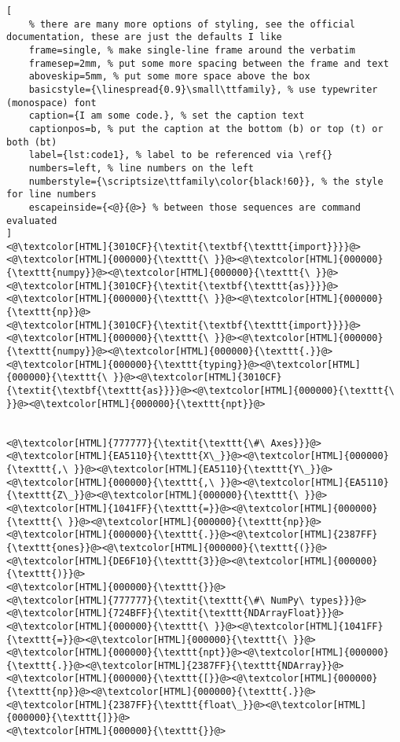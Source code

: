 \begin{lstlisting}[
	% there are many more options of styling, see the official documentation, these are just the defaults I like
	frame=single, % make single-line frame around the verbatim
	framesep=2mm, % put some more spacing between the frame and text
	aboveskip=5mm, % put some more space above the box
	basicstyle={\linespread{0.9}\small\ttfamily}, % use typewriter (monospace) font
	caption={I am some code.}, % set the caption text
	captionpos=b, % put the caption at the bottom (b) or top (t) or both (bt)
	label={lst:code1}, % label to be referenced via \ref{}
	numbers=left, % line numbers on the left
	numberstyle={\scriptsize\ttfamily\color{black!60}}, % the style for line numbers
	escapeinside={<@}{@>} % between those sequences are command evaluated
]
<@\textcolor[HTML]{3010CF}{\textit{\textbf{\texttt{import}}}}@><@\textcolor[HTML]{000000}{\texttt{\ }}@><@\textcolor[HTML]{000000}{\texttt{numpy}}@><@\textcolor[HTML]{000000}{\texttt{\ }}@><@\textcolor[HTML]{3010CF}{\textit{\textbf{\texttt{as}}}}@><@\textcolor[HTML]{000000}{\texttt{\ }}@><@\textcolor[HTML]{000000}{\texttt{np}}@>
<@\textcolor[HTML]{3010CF}{\textit{\textbf{\texttt{import}}}}@><@\textcolor[HTML]{000000}{\texttt{\ }}@><@\textcolor[HTML]{000000}{\texttt{numpy}}@><@\textcolor[HTML]{000000}{\texttt{.}}@><@\textcolor[HTML]{000000}{\texttt{typing}}@><@\textcolor[HTML]{000000}{\texttt{\ }}@><@\textcolor[HTML]{3010CF}{\textit{\textbf{\texttt{as}}}}@><@\textcolor[HTML]{000000}{\texttt{\ }}@><@\textcolor[HTML]{000000}{\texttt{npt}}@>


<@\textcolor[HTML]{777777}{\textit{\texttt{\#\ Axes}}}@>
<@\textcolor[HTML]{EA5110}{\texttt{X\_}}@><@\textcolor[HTML]{000000}{\texttt{,\ }}@><@\textcolor[HTML]{EA5110}{\texttt{Y\_}}@><@\textcolor[HTML]{000000}{\texttt{,\ }}@><@\textcolor[HTML]{EA5110}{\texttt{Z\_}}@><@\textcolor[HTML]{000000}{\texttt{\ }}@><@\textcolor[HTML]{1041FF}{\texttt{=}}@><@\textcolor[HTML]{000000}{\texttt{\ }}@><@\textcolor[HTML]{000000}{\texttt{np}}@><@\textcolor[HTML]{000000}{\texttt{.}}@><@\textcolor[HTML]{2387FF}{\texttt{ones}}@><@\textcolor[HTML]{000000}{\texttt{(}}@><@\textcolor[HTML]{DE6F10}{\texttt{3}}@><@\textcolor[HTML]{000000}{\texttt{)}}@>
<@\textcolor[HTML]{000000}{\texttt{}}@>
<@\textcolor[HTML]{777777}{\textit{\texttt{\#\ NumPy\ types}}}@>
<@\textcolor[HTML]{724BFF}{\textit{\texttt{NDArrayFloat}}}@><@\textcolor[HTML]{000000}{\texttt{\ }}@><@\textcolor[HTML]{1041FF}{\texttt{=}}@><@\textcolor[HTML]{000000}{\texttt{\ }}@><@\textcolor[HTML]{000000}{\texttt{npt}}@><@\textcolor[HTML]{000000}{\texttt{.}}@><@\textcolor[HTML]{2387FF}{\texttt{NDArray}}@><@\textcolor[HTML]{000000}{\texttt{[}}@><@\textcolor[HTML]{000000}{\texttt{np}}@><@\textcolor[HTML]{000000}{\texttt{.}}@><@\textcolor[HTML]{2387FF}{\texttt{float\_}}@><@\textcolor[HTML]{000000}{\texttt{]}}@>
<@\textcolor[HTML]{000000}{\texttt{}}@>


\end{lstlisting}
